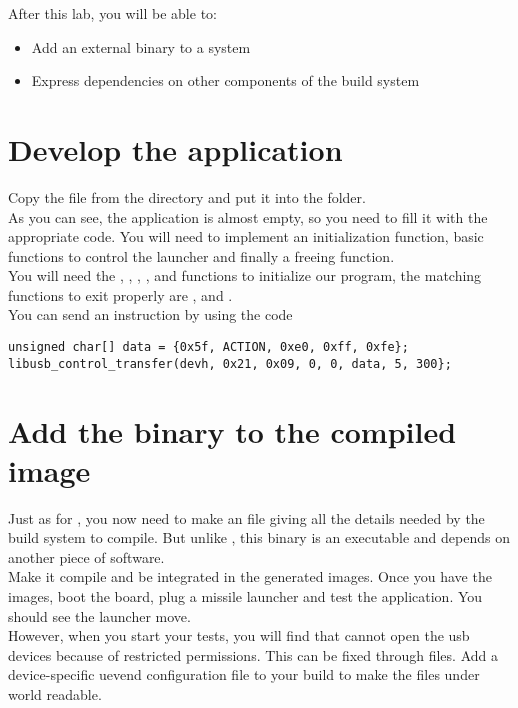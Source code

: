 
After this lab, you will be able to:
\begin{itemize}
  \item Add an external binary to a system
  \item Express dependencies on other components of the build system
\end{itemize}

\section{Develop the application}

Copy the  file from the
 directory and put it
into the  folder.\\

As you can see, the application is almost empty, so you need to fill
it with the appropriate code. You will need to implement an
initialization function, basic functions to control the launcher and
finally a freeing function.\\

You will need the , ,
, ,
 and 
functions to initialize our program, the matching functions to exit
properly are , 
and .\\

You can send an instruction by using the code
\begin{lstlisting}
unsigned char[] data = {0x5f, ACTION, 0xe0, 0xff, 0xfe};
libusb_control_transfer(devh, 0x21, 0x09, 0, 0, data, 5, 300};
\end{lstlisting}

\section{Add the binary to the compiled image}

Just as for , you now need to make an  file
giving all the details needed by the build system to compile. But
unlike , this binary is an executable and depends on another
piece of software.\\

Make it compile and be integrated in the generated images. Once you
have the images, boot the board, plug a missile launcher and test the
application. You should see the launcher move.\\

However, when you start your tests, you will find that  cannot open
the usb devices because of restricted permissions. This can be fixed
through  files. Add a device-specific uevend
configuration file to your build to make the files under
 world readable.\\
